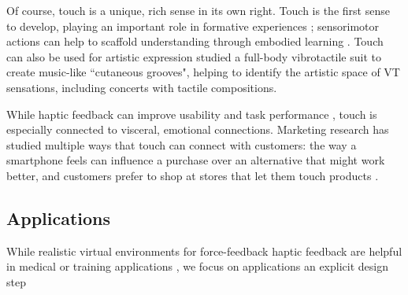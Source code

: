 Of course, touch is a unique, rich sense in its own right.
Touch is the first sense to develop, playing an important role in formative experiences \cite{Jansson-Boyd2011};
sensorimotor actions can help to scaffold understanding through embodied learning \cite{Papert1980}.
Touch can also be used for artistic expression\revRG{:} \citet{Gunther2002} studied a full-body vibrotactile suit to create music-like ``cutaneous grooves", helping to identify the artistic space of VT sensations, including concerts with tactile compositions.

While haptic feedback can improve usability and task performance \cite{Pielot2009,Chan2008}, touch is especially connected to visceral, emotional connections.
Marketing research has studied multiple ways that touch can connect with customers:
the way a smartphone feels can influence a purchase over an alternative that might work better, and customers prefer to shop at stores that let them touch products \cite{Spence2011,Jansson-Boyd2011}.
















\subsection{Applications}
While realistic virtual environments for force-feedback haptic feedback are helpful in medical or training applications  \cite{Okamura2009,VanDerMeijden2009}, we focus on applications  an explicit  design step


